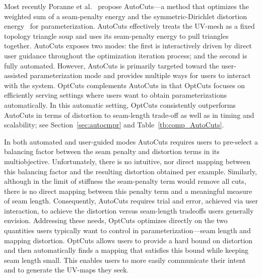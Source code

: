 Most recently Poranne et al.\  propose AutoCuts---a method that optimizes the weighted sum of a seam-penalty energy and the symmetric-Dirichlet distortion energy~\cite{Smith2015Bijective} for parameterization. AutoCuts effectively treats the UV-mesh as a fixed topology triangle soup and uses its seam-penalty energy to pull triangles together. AutoCuts exposes two modes: the first is interactively driven by direct user guidance throughout the optimization iteration process; and the second is fully automated. However, AutoCuts is primarily targeted toward the user-assisted parameterization mode and provides multiple ways for users to interact with the system. OptCuts complements AutoCuts in that OptCuts focuses on efficiently serving settings where users want to obtain parameterizations automatically. In this automatic setting, OptCuts consistently outperforms AutoCuts in terms of distortion to seam-length trade-off as well as in timing and scalability; see Section~\ref{sec:autocmpr} and Table~\ref{tb:comp_AutoCuts}. 

In both automated and user-guided modes AutoCuts requires users to pre-select a balancing factor between the seam penalty and distortion terms in its multiobjective. Unfortunately, there is no intuitive, nor direct mapping between this balancing factor and the resulting distortion obtained per example. Similarly, although in the limit of stiffness the seam-penalty term would remove all cuts, there is no direct mapping between this penalty term and a meaningful measure of seam length. Consequently, AutoCuts requires trial and error, achieved via user interaction, to achieve the distortion versus seam-length tradeoffs users generally envision. 
%
Addressing these needs, OptCuts optimizes directly on the two quantities users typically want to control in parameterization---seam length and mapping distortion. OptCuts allows users to provide a hard bound on distortion and then automatically finds a mapping that satisfies this bound while keeping seam length small. This enables users to more easily communicate their intent and to generate the UV-maps they seek.

